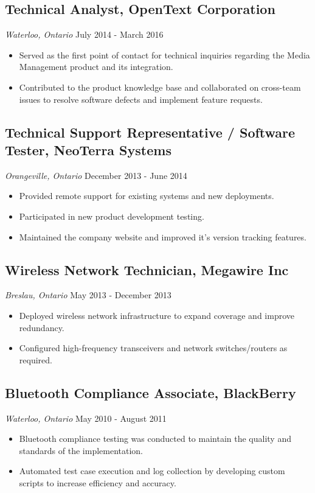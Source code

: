 \documentclass[a4paper,11pt]{article}  %
\begin{document}
\subsection*{Technical Analyst, OpenText Corporation}
\textit{Waterloo, Ontario} \hfill July 2014 - March 2016
\begin{itemize}
    \item Served as the first point of contact for technical inquiries regarding the Media Management product and its integration.
    \item Contributed to the product knowledge base and collaborated on cross-team issues to resolve software defects and implement feature requests.
\end{itemize}

\subsection*{Technical Support Representative / Software Tester, NeoTerra Systems}
\textit{Orangeville, Ontario} \hfill December 2013 - June 2014
\begin{itemize}
    \item Provided remote support for existing systems and new deployments.
    \item Participated in new product development testing.  
    \item Maintained the company website and improved it's version tracking features.
\end{itemize}

\subsection*{Wireless Network Technician, Megawire Inc}
\textit{Breslau, Ontario} \hfill May 2013 - December 2013
\begin{itemize}
    \item Deployed wireless network infrastructure to expand coverage and improve redundancy. 
    \item Configured high-frequency transceivers and network switches/routers as required.
\end{itemize}

\subsection*{Bluetooth Compliance Associate, BlackBerry}
\textit{Waterloo, Ontario} \hfill May 2010 - August 2011
\begin{itemize}
    \item Bluetooth compliance testing was conducted to maintain the quality and standards of the implementation.
    \item Automated test case execution and log collection by developing custom scripts to increase efficiency and accuracy.
\end{itemize}
\end{document}
